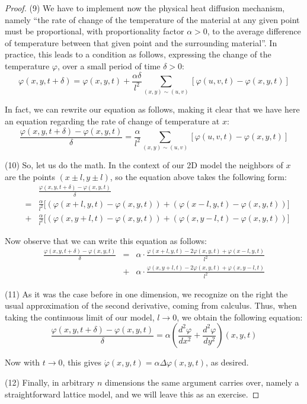 \documentclass[12pt]{amsbook}
\begin{document}
\begin{proof}
(9) We have to implement now the physical heat diffusion mechanism, namely ``the rate of change of the temperature of the material at any given point must be proportional, with proportionality factor $\alpha>0$, to the average difference of temperature between that given point and the surrounding material''. In practice, this leads to a condition as follows, expressing the change of the temperature $\varphi$, over a small period of time $\delta>0$:
$$\varphi(x,y,t+\delta)=\varphi(x,y,t)+\frac{\alpha\delta}{l^2}\sum_{(x,y)\sim(u,v)}\left[\varphi(u,v,t)-\varphi(x,y,t)\right]$$

In fact, we can rewrite our equation as follows, making it clear that we have here an equation regarding the rate of change of temperature at $x$:
$$\frac{\varphi(x,y,t+\delta)-\varphi(x,y,t)}{\delta}=\frac{\alpha}{l^2}\sum_{(x,y)\sim(u,v)}\left[\varphi(u,v,t)-\varphi(x,y,t)\right]$$

(10) So, let us do the math. In the context of our 2D model the neighbors of $x$ are the points $(x\pm l,y\pm l)$, so the equation above takes the following form:
\begin{eqnarray*}
&&\frac{\varphi(x,y,t+\delta)-\varphi(x,y,t)}{\delta}\\
&=&\frac{\alpha}{l^2}\Big[(\varphi(x+l,y,t)-\varphi(x,y,t))+(\varphi(x-l,y,t)-\varphi(x,y,t))\Big]\\
&+&\frac{\alpha}{l^2}\Big[(\varphi(x,y+l,t)-\varphi(x,y,t))+(\varphi(x,y-l,t)-\varphi(x,y,t))\Big]
\end{eqnarray*}

Now observe that we can write this equation as follows:
\begin{eqnarray*}
\frac{\varphi(x,y,t+\delta)-\varphi(x,y,t)}{\delta}
&=&\alpha\cdot\frac{\varphi(x+l,y,t)-2\varphi(x,y,t)+\varphi(x-l,y,t)}{l^2}\\
&+&\alpha\cdot\frac{\varphi(x,y+l,t)-2\varphi(x,y,t)+\varphi(x,y-l,t)}{l^2}
\end{eqnarray*}

(11) As it was the case before in one dimension, we recognize on the right the usual approximation of the second derivative, coming from calculus. Thus, when taking the continuous limit of our model, $l\to 0$, we obtain the following equation:
$$\frac{\varphi(x,y,t+\delta)-\varphi(x,y,t)}{\delta}
=\alpha\left(\frac{d^2\varphi}{dx^2}+\frac{d^2\varphi}{dy^2}\right)(x,y,t)$$

Now with $t\to0$, this gives $\dot{\varphi}(x,y,t)=\alpha\Delta\varphi(x,y,t)$, as desired. 

\medskip

(12) Finally, in arbitrary $n$ dimensions the same argument carries over, namely a straightforward lattice model, and we will leave this as an exercise.
\end{proof}
\end{document}
